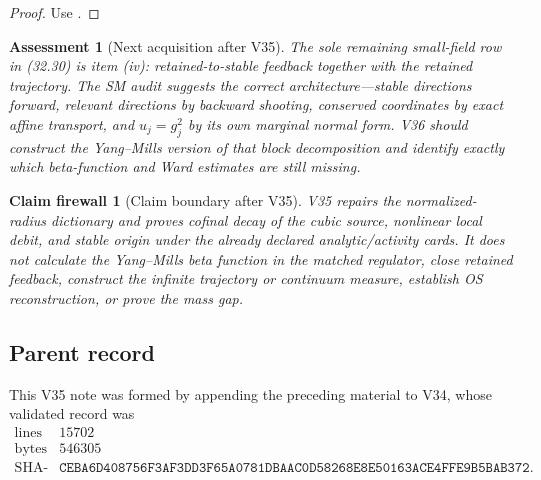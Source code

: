 \documentclass[11pt,oneside]{book}
\newtheorem{assessment}[theorem]{Assessment}
\newtheorem{firewall}[theorem]{Claim firewall}
\theoremstyle{definition}
\theoremstyle{remark}
\begin{document}
\begin{proof}
Use
.
\end{proof}

\begin{assessment}[Next acquisition after V35]
\label{ass:e8v35-status}
The sole remaining small-field row in (32.30) is item (iv):
retained-to-stable feedback together with the retained trajectory.
The SM audit suggests the correct architecture---stable directions
forward, relevant directions by backward shooting, conserved
coordinates by exact affine transport, and \(u_j=g_j^2\) by its own
marginal normal form.  V36 should construct the Yang--Mills version
of that block decomposition and identify exactly which beta-function
and Ward estimates are still missing.
\end{assessment}

\begin{firewall}[Claim boundary after V35]
\label{fire:e8v35-claim}
V35 repairs the normalized-radius dictionary and proves cofinal
decay of the cubic source, nonlinear local debit, and stable origin
under the already declared analytic/activity cards.  It does not
calculate the Yang--Mills beta function in the matched regulator,
close retained feedback, construct the infinite trajectory or
continuum measure, establish OS reconstruction, or prove the mass
gap.
\end{firewall}

\subsection{Parent record}

This V35 note was formed by appending the preceding material to V34,
whose validated record was
\[
\begin{array}{c|c}
\text{lines}&15702\\
\text{bytes}&546305\\
\text{SHA-256}&
\texttt{CEBA6D408756F3AF3DD3F65A0781DBAAC0D58268E8E50163ACE4FFE9B5BAB372}.
\end{array}
\]


\end{document}
